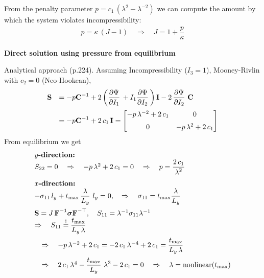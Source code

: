 From the penalty parameter $p = c_1\,(\lambda^2-\lambda^{-2})$ we can compute the amount by which the system violates incompressibility:
\begin{equation*}
  \begin{array}{lll}
    p = \kappa\,(J-1) \quad \Rightarrow \quad J = 1 + \dfrac{p}{\kappa}
  \end{array}
\end{equation*}

\textbf{Direct solution using pressure from equilibrium}

Analytical approach (p.224). Assuming Incompressibility ($I_3 = 1$), Mooney-Rivlin with $c_2 = 0$ (Neo-Hookean),
\begin{equation}\label{eq:analytical_app}
  \begin{array}{lll}
    \bfS &= -p\bfC^{-1} + 2\left(\p{\Psi}{I_1} + I_1\p{\Psi}{I_2}\right)\bfI - 2\,\p{\Psi}{I_2}\,\bfC\\[4mm]
     &= -p\bfC^{-1} + 2\,c_1\,\bfI =
      \matt{-p\,\lambda^{-2} + 2\,c_1 & 0\\[2mm] 
     0 & -p\,\lambda^2 + 2\,c_1 }
  \end{array}
\end{equation}
From equilibrium we get
\begin{equation*}
  \begin{array}{lll}
    \textbf{$y$-direction:}\\
    S_{22} = 0 \quad \Rightarrow \quad -p\,\lambda^2 + 2\,c_1 = 0 \quad \Rightarrow \quad p = \displaystyle\frac{\displaystyle{2\,c_1}}{\displaystyle{\lambda^2}}\,\\[4mm]
    
    \textbf{$x$-direction:}\\
    -\sigma_{11}\,l_y + t_\text{max}\,\displaystyle\frac{\displaystyle{\lambda}}{\displaystyle{L_y}}\,\,l_y = 0,\quad \Rightarrow \quad 
    \sigma_{11} = t_\text{max}\displaystyle\frac{\displaystyle{\lambda}}{\displaystyle{L_y}}\,\\[4mm]
    \textbf{S} = J\,\textbf{F}^{-1} \boldsymbol{\sigma} \textbf{F}^{-\top}, \quad 
    S_{11} = \lambda^{-1} \sigma_{11} \lambda^{-1}\\
    \Rightarrow \quad S_{11} \overset{!}{=} \displaystyle\frac{\displaystyle{t_\text{max}}}{\displaystyle{L_y\,\lambda}}\,\\[4mm]
    \quad \Rightarrow \quad -p\,\lambda^{-2} + 2\,c_1 = -2\,c_1\,\lambda^{-4} + 2\,c_1 = \displaystyle\frac{\displaystyle{t_\text{max}}}{\displaystyle{L_y\,\lambda}}\,\\[4mm]
    \quad \Rightarrow \quad 2\,c_1\,\lambda^{4} - \displaystyle\frac{\displaystyle{t_\text{max}}}{\displaystyle{L_y}}\,\,\lambda^3 -2\,c_1 = 0
    \quad \Rightarrow \quad \lambda = \text{nonlinear($t_\text{max}$)}
  \end{array}
\end{equation*}
